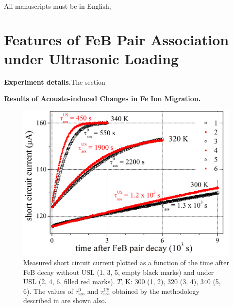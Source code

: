 \documentclass{ttp}
\begin{document}
All manuscripts must be in English,


\section{Features of FeB Pair Association under Ultrasonic Loading}

\noindent \textbf{Experiment details.}The section



\noindent \textbf{Results of Acousto-induced Changes in Fe Ion Migration.}



\begin{figure}
	\centering
     \includegraphics[width=\linewidth]{Fig1.png}
	  \caption{Measured short circuit current plotted as a function of the time after FeB decay
      without USL (1, 3, 5, empty black marks) and under USL (2, 4, 6. filled red marks).
      $T$, K: 300 (1, 2), 320 (3, 4), 340 (5, 6).
      The values of $\tau_\mathrm{ass}^0$ and $\tau_\mathrm{ass}^\mathrm{US}$ obtained 
      by the methodology described in \cite{Olikh2021JAP,Olikh2022:JMatSci} are shown also.
}\label{fig1}
\end{figure}
\end{document}
